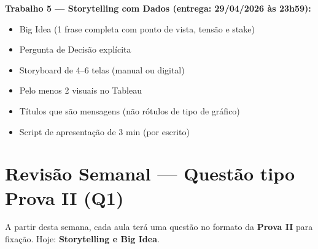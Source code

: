 \begin{SolvedBox}
\textbf{Trabalho 5 — Storytelling com Dados (entrega: 29/04/2026 às 23h59):}
\begin{itemize}
  \item[$\square$] Big Idea (1 frase completa com ponto de vista, tensão e stake)
  \item[$\square$] Pergunta de Decisão explícita
  \item[$\square$] Storyboard de 4–6 telas (manual ou digital)
  \item[$\square$] Pelo menos 2 visuais no Tableau
  \item[$\square$] Títulos que são mensagens (não rótulos de tipo de gráfico)
  \item[$\square$] Script de apresentação de 3 min (por escrito)
\end{itemize}
\end{SolvedBox}

\section{Revisão Semanal — Questão tipo Prova II (Q1)}

\begin{NoteBox}
A partir desta semana, cada aula terá uma questão no formato da
\textbf{Prova II} para fixação. Hoje: \textbf{Storytelling e Big Idea}.
\end{NoteBox}

